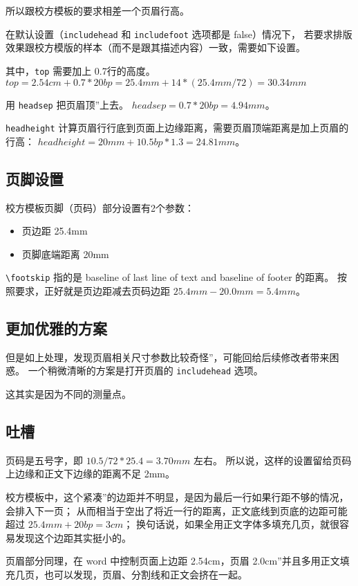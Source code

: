 \documentclass[../Main/thesis.tex]{subfiles}
\begin{document}
所以跟校方模板的要求相差一个页眉行高。

在默认设置（\texttt{includehead} 和 \texttt{includefoot} 选项都是
false）情况下，
若要求排版效果跟校方模版的样本（而不是跟其描述内容）一致，需要如下设置。


其中，\texttt{top} 需要加上 0.7行的高度。
\(top = 2.54cm + 0.7*20bp = 25.4mm + 14*(25.4mm/72) = 30.34mm\)

用 \texttt{headsep} 把页眉顶''上去。 \(headsep = 0.7*20bp = 4.94mm\)。

\texttt{headheight}
计算页眉行行底到页面上边缘距离，需要页眉顶端距离是加上页眉的行高：
\(headheight = 20mm + 10.5bp*1.3 = 24.81mm\)。

\subsection{页脚设置}
校方模板页脚（页码）部分设置有2个参数：
\begin{itemize}[\textbullet]
  \item 页边距 25.4mm
  \item 页脚底端距离 20mm
\end{itemize}

\texttt{\textbackslash{}footskip} 指的是 baseline of last line of text
and baseline of footer 的距离。 按照要求，正好就是页边距减去页码边距
\(25.4mm - 20.0mm = 5.4mm\)。

\subsection{更加优雅的方案}

但是如上处理，发现页眉相关尺寸参数比较奇怪''，可能回给后续修改者带来困惑。
一个稍微清晰的方案是打开页眉的 \texttt{includehead} 选项。

这其实是因为不同的测量点。

\subsection{吐槽}

页码是五号字，即 \(10.5/72*25.4 = 3.70mm\) 左右。
所以说，这样的设置留给页码上边缘和正文下边缘的距离不足 2mm。

校方模板中，这个紧凑''的边距并不明显，是因为最后一行如果行距不够的情况，会排入下一页；
从而相当于空出了将近一行的距离，正文底线到页底的边距可能超过
\(25.4mm + 20bp = 3cm\)；
换句话说，如果全用正文字体多填充几页，就很容易发现这个边距其实挺小的。

页眉部分同理，在 word 中控制页面上边距 2.54cm，页眉
2.0cm''并且多用正文填充几页，也可以发现，页眉、分割线和正文会挤在一起。
\end{document}
